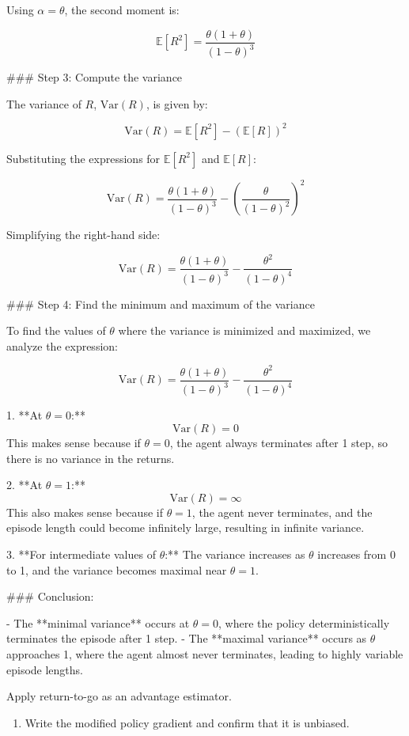 \documentclass{article}
\begin{document}
\begin{enumerate}
Using \( \alpha = \theta \), the second moment is:

\[
\mathbb{E}[R^2] = \frac{\theta(1 + \theta)}{(1 - \theta)^3}
\]

### Step 3: Compute the variance

The variance of \( R \), \( \text{Var}(R) \), is given by:

\[
\text{Var}(R) = \mathbb{E}[R^2] - (\mathbb{E}[R])^2
\]

Substituting the expressions for \( \mathbb{E}[R^2] \) and \( \mathbb{E}[R] \):

\[
\text{Var}(R) = \frac{\theta(1 + \theta)}{(1 - \theta)^3} - \left( \frac{\theta}{(1 - \theta)^2} \right)^2
\]

Simplifying the right-hand side:

\[
\text{Var}(R) = \frac{\theta(1 + \theta)}{(1 - \theta)^3} - \frac{\theta^2}{(1 - \theta)^4}
\]

### Step 4: Find the minimum and maximum of the variance

To find the values of \( \theta \) where the variance is minimized and maximized, we analyze the expression:

\[
\text{Var}(R) = \frac{\theta(1 + \theta)}{(1 - \theta)^3} - \frac{\theta^2}{(1 - \theta)^4}
\]

1. **At \( \theta = 0 \):**
\[
\text{Var}(R) = 0
\]
This makes sense because if \( \theta = 0 \), the agent always terminates after 1 step, so there is no variance in the returns.

2. **At \( \theta = 1 \):**
\[
\text{Var}(R) = \infty
\]
This also makes sense because if \( \theta = 1 \), the agent never terminates, and the episode length could become infinitely large, resulting in infinite variance.

3. **For intermediate values of \( \theta \):**
The variance increases as \( \theta \) increases from 0 to 1, and the variance becomes maximal near \( \theta = 1 \).

### Conclusion:

- The **minimal variance** occurs at \( \theta = 0 \), where the policy deterministically terminates the episode after 1 step.
- The **maximal variance** occurs as \( \theta \) approaches 1, where the agent almost never terminates, leading to highly variable episode lengths.



\newpage
{} Apply return-to-go as an advantage estimator.
\begin{enumerate}
    \item Write the modified policy gradient and confirm that it is unbiased.


\end{enumerate}
\end{enumerate}
\end{document}
